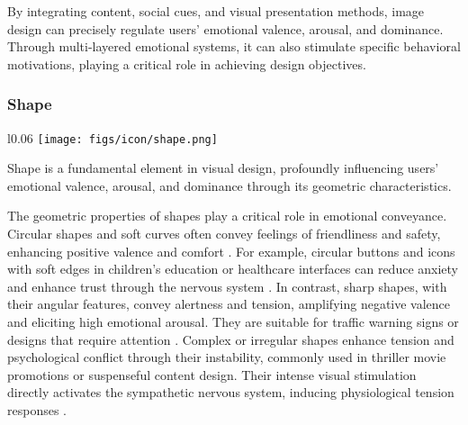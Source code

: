 By integrating content, social cues, and visual presentation methods, image design can precisely regulate users’ emotional valence, arousal, and dominance. Through multi-layered emotional systems, it can also stimulate specific behavioral motivations, playing a critical role in achieving design objectives.

\subsubsection{Shape}
\begin{wrapfigure}{l}{0.06\textwidth}
  \vspace{-11pt} %
        \texttt{[image: figs/icon/shape.png]}
\end{wrapfigure} 
Shape is a fundamental element in visual design, profoundly influencing users’ emotional valence, arousal, and dominance through its geometric characteristics.

The geometric properties of shapes play a critical role in emotional conveyance. Circular shapes and soft curves often convey feelings of friendliness and safety, enhancing positive valence and comfort \cite{lu2012shape}. For example, circular buttons and icons with soft edges in children’s education or healthcare interfaces can reduce anxiety and enhance trust through the nervous system \cite{ledoux2000emotion}. In contrast, sharp shapes, with their angular features, convey alertness and tension, amplifying negative valence and eliciting high emotional arousal. They are suitable for traffic warning signs or designs that require attention \cite{thumfart2008modeling}. Complex or irregular shapes enhance tension and psychological conflict through their instability, commonly used in thriller movie promotions or suspenseful content design. Their intense visual stimulation directly activates the sympathetic nervous system, inducing physiological tension responses \cite{ebe2015emotion}.


